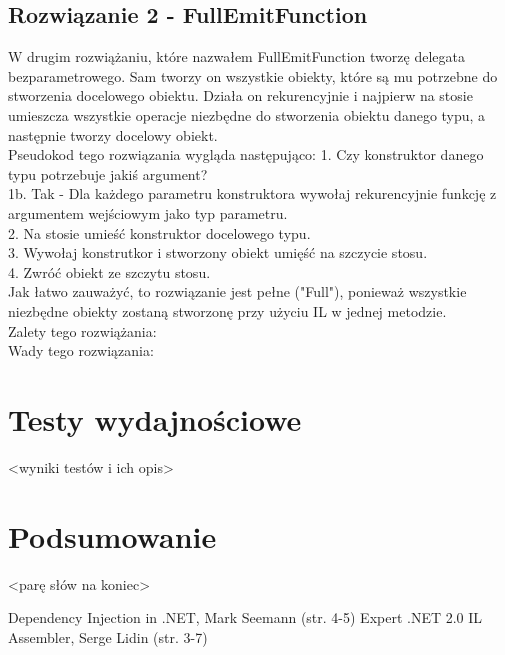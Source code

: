 \documentclass[12pt]{article}
\begin{document}
\subsection{Rozwiązanie 2 - FullEmitFunction}
W drugim rozwiążaniu, które nazwałem FullEmitFunction tworzę delegata bezparametrowego. Sam tworzy on wszystkie obiekty, które są mu potrzebne do stworzenia docelowego obiektu. Działa on rekurencyjnie i najpierw na stosie umieszcza wszystkie operacje niezbędne do stworzenia obiektu danego typu, a następnie tworzy docelowy obiekt.\\
Pseudokod tego rozwiązania wygląda następująco:
1. Czy konstruktor danego typu potrzebuje jakiś argument?\\
1b. Tak - Dla każdego parametru konstruktora wywołaj rekurencyjnie funkcję z argumentem wejściowym jako typ parametru.\\
2. Na stosie umieść konstruktor docelowego typu.\\
3. Wywołaj konstrutkor i stworzony obiekt umięść na szczycie stosu.\\
4. Zwróć obiekt ze szczytu stosu.\\
Jak łatwo zauważyć, to rozwiązanie jest pełne ("Full"), ponieważ wszystkie niezbędne obiekty zostaną stworzonę przy użyciu IL w jednej metodzie.\\
Zalety tego rozwiążania:\\
Wady tego rozwiązania:\\

\section{Testy wydajnościowe}
<wyniki testów i ich opis>

\section{Podsumowanie}
<parę słów na koniec>

\newpage
\begin{thebibliography}{authordate1}
 Dependency Injection in .NET, Mark Seemann (str. 4-5)
 Expert .NET 2.0 IL Assembler, Serge Lidin (str. 3-7)
\end{thebibliography}
\end{document}
